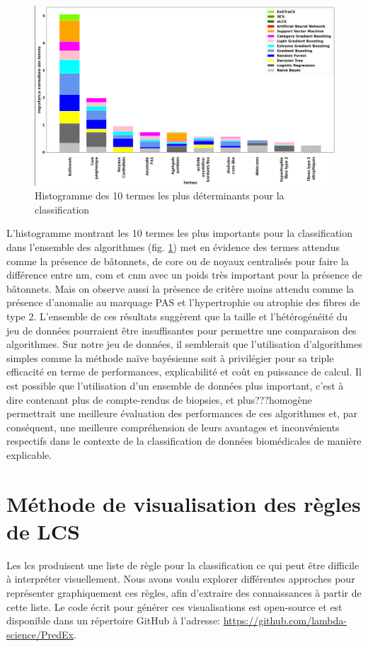 \begin{figure}[!ht]
  \centering
  \includegraphics[width=1\textwidth]{figures/feature_importance.png}
  \caption[Histogramme des 10 termes les plus déterminants pour la classification]{Histogramme des 10 termes les plus déterminants pour la classification}
  \label{fig:feautre_importance}
\end{figure}
L'histogramme montrant les 10 termes les plus importants pour la classification dans l'ensemble des algorithmes (fig. \ref{fig:feautre_importance}) met en évidence des termes attendus comme la présence de bâtonnets, de core ou de noyaux centralisés pour faire la différence entre \gls{nm}, \gls{com} et \gls{cnm} avec un poids très important pour la présence de bâtonnets. Mais on observe aussi la présence de critère moins attendu comme la présence d'anomalie au marquage PAS et l'hypertrophie ou atrophie des fibres de type 2.
L'ensemble de ces résultats suggèrent que la taille et l'hétérogénéité du jeu de données pourraient être insuffisantes pour permettre une comparaison des algorithmes. Sur notre jeu de données, il semblerait que l'utilisation d'algorithmes simples comme la méthode naïve bayésienne soit à privilégier pour sa triple efficacité en terme de performances, explicabilité et coût en puissance de calcul.  Il est possible que l'utilisation d'un ensemble de données plus important, c'est à dire contenant plus de compte-rendus de biopsies, et plus???homogène permettrait une meilleure évaluation des performances de ces algorithmes et, par conséquent, une meilleure compréhension de leurs avantages et inconvénients respectifs dans le contexte de la classification de données biomédicales de manière explicable.
\section{Méthode de visualisation des règles de LCS}
Les \gls{lcs} produisent une liste de règle pour la classification ce qui peut être difficile à interpréter visuellement. Nous avons voulu explorer différentes approches pour représenter graphiquement ces règles, afin d'extraire des connaissances à partir de cette liste. Le code écrit pour générer ces visualisations est open-source et est disponible dans un répertoire GitHub à l'adresse: \href{https://github.com/lambda-science/PredEx}{https://github.com/lambda-science/PredEx}.
